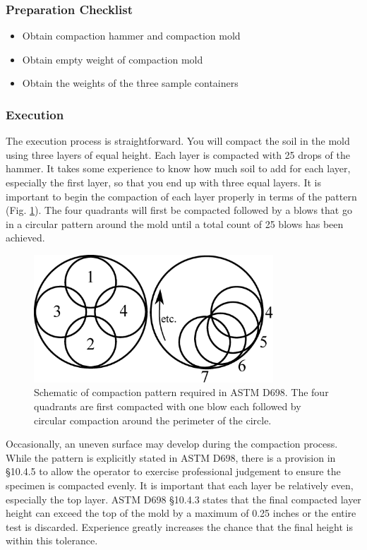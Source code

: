 \documentclass[12pt]{article}
\begin{document}
\subsubsection*{Preparation Checklist}
\begin{itemize}
    \item Obtain compaction hammer and compaction mold
    \item Obtain empty weight of compaction mold
    \item Obtain the weights of the three sample containers
\end{itemize}

\subsubsection{Execution}
The execution process is straightforward. You will compact the soil in the mold using three layers of equal height. Each layer is compacted with 25 drops of the hammer. It takes some experience to know how much soil to add for each layer, especially the first layer, so that you end up with three equal layers. It is important to begin the compaction of each layer properly in terms of the pattern (Fig. \ref{fig:compactionpattern}). The four quadrants will first be compacted followed by a blows that go in a circular pattern around the mold until a total count of 25 blows has been achieved.

\begin{figure}
    \centering
    \includegraphics[width=0.8\textwidth]{compactionpattern.eps}
    \caption{Schematic of compaction pattern required in ASTM D698. The four quadrants are first compacted with one blow each followed by circular compaction around the perimeter of the circle.}
    \label{fig:compactionpattern}
\end{figure}

Occasionally, an uneven surface may develop during the compaction process. While the pattern is explicitly stated in ASTM D698, there is a provision in \S10.4.5 to allow the operator to exercise professional judgement to ensure the specimen is compacted evenly. It is important that each layer be relatively even, especially the top layer. ASTM D698 \S10.4.3 states that the final compacted layer height can exceed the top of the mold by a maximum of 0.25 inches or the entire test is discarded. Experience greatly increases the chance that the final height is within this tolerance.
\end{document}
